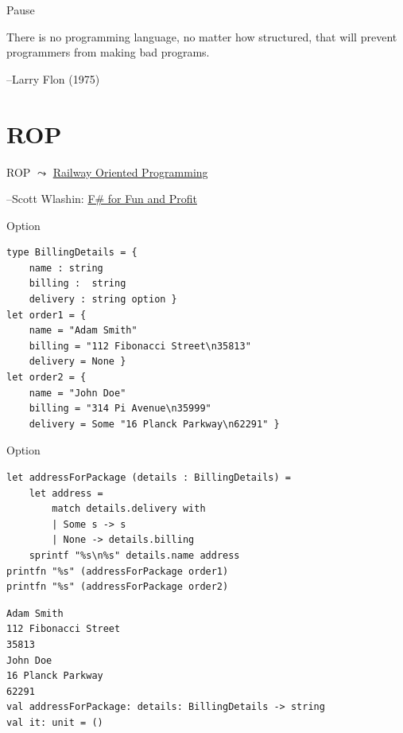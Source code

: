 \documentclass[t]{beamer}
\begin{document}
\begin{frame}[label={sec:org0edeea1}]{Pause}
\begin{block}{}
There is no programming language, no matter how structured, 
that will prevent programmers from making bad programs.

\null\hfill--Larry Flon (1975)
\end{block}
\end{frame}

\section{ROP }
\label{sec:org093f422}
\begin{frame}[label={sec:orge2d6aef}]{ROP}
\(\leadsto\) \href{./2 Railway Oriented Programming.pdf}{Railway Oriented Programming}

\null\hfill--Scott Wlashin: \href{https://fsharpforfunandprofit.com/rop/}{F\# for Fun and Profit}
\end{frame}

\begin{frame}[label={sec:org75bf1f6},fragile]{Option}
 \begin{verbatim}
type BillingDetails = { 
    name : string
    billing :  string
    delivery : string option }
let order1 = {
    name = "Adam Smith"
    billing = "112 Fibonacci Street\n35813" 
    delivery = None }
let order2 = {
    name = "John Doe"
    billing = "314 Pi Avenue\n35999"
    delivery = Some "16 Planck Parkway\n62291" }
\end{verbatim}
\end{frame}

\begin{frame}[label={sec:orgfe7e470},fragile]{Option}
 \begin{verbatim}
let addressForPackage (details : BillingDetails) = 
    let address =
        match details.delivery with 
        | Some s -> s
        | None -> details.billing
    sprintf "%s\n%s" details.name address
printfn "%s" (addressForPackage order1)
printfn "%s" (addressForPackage order2)
\end{verbatim}

\begin{verbatim}
Adam Smith
112 Fibonacci Street
35813
John Doe
16 Planck Parkway
62291
val addressForPackage: details: BillingDetails -> string
val it: unit = ()
\end{verbatim}
\end{frame}
\end{document}
